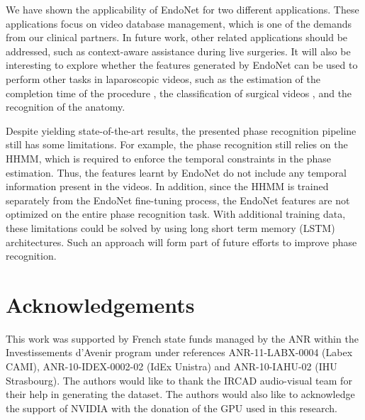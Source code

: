 \documentclass[journal]{IEEEtran} \usepackage{amssymb}
\begin{document}
We have shown the applicability of EndoNet for two different applications. These applications focus on video database management, which is one of the demands from our clinical partners. In future work, other related applications should be addressed, such as context-aware assistance during live surgeries. It will also be interesting to explore whether the features generated by EndoNet can be used to perform other tasks in laparoscopic videos, such as the estimation of the completion time of the procedure \cite{padoy_mia2012}, the classification of surgical videos \cite{twinanda_ipcai2014}, and the recognition of the anatomy.

Despite yielding state-of-the-art results, the presented phase recognition pipeline still has some limitations. For example, the phase recognition still relies on the HHMM, which is required to enforce the temporal constraints in the phase estimation. Thus, the features learnt by EndoNet do not include any temporal information present in the videos. In addition, since the HHMM is trained separately from the EndoNet fine-tuning process, the EndoNet features are not optimized on the entire phase recognition task. With additional training data, these limitations could be solved by using long short term memory (LSTM) architectures. Such an approach will form part of future efforts to improve phase recognition. 



\section*{Acknowledgements}

This work was supported by French state funds managed by the ANR within
the Investissements d'Avenir program under references ANR-11-LABX-0004
(Labex CAMI), ANR-10-IDEX-0002-02 (IdEx Unistra) and ANR-10-IAHU-02
(IHU Strasbourg). The authors would like to thank the IRCAD audio-visual
team for their help in generating the dataset. The authors would also
like to acknowledge the support of NVIDIA with the donation of the GPU used in this research.



\end{document}
